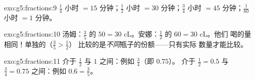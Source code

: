 \begin{solution}{exo:g5:fractions:9}
$\frac14$ 小时 $= 15$ 分钟；$\frac12$ 小时 $= 30$ 分钟；$\frac34$ 小时 $= 45$
分钟；$\frac{1}{60}$ 小时 $= 1$ 分钟。
\end{solution}

\begin{solution}{exo:g5:fractions:10}
汤姆：$\frac35$ 的 $50 = 30$ cL。安娜：$\frac12$ 的 $60 = 30$ cL。他们
喝的量相同！单独的（$\frac35 > \frac12$）
比较的是\emph{不同}瓶子的份额——只有实际
数量才能比较。
\end{solution}

\begin{solution}{exo:g5:fractions:11}
介于 $\frac12$ 与 $1$ 之间：例如 $\frac34$（即 $0.75$）。
介于 $\frac12 = 0.5$ 与 $\frac34 = 0.75$ 之间：例如 $0.6 =
\frac35$。
\end{solution}
